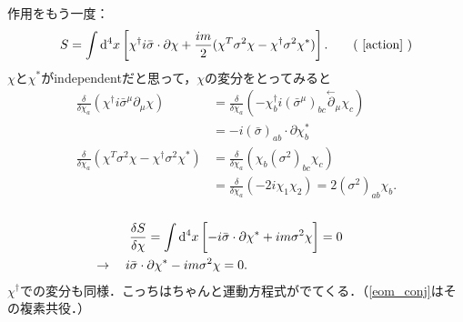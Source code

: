 \documentclass[pdflatex,unicode,ja=standard,12pt]{beamer}
\begin{document}
\begin{frame}
  
  \frametitle{\subsecname}

  作用をもう一度：
  \begin{equation}
    S
    =
    \int\dd^4 x
    \left[  
      \chi^{\dag}i\bar{\sigma}\cdot\partial\chi
      +
      \frac{im}{2}
      (  
        \chi^{T}\sigma^2\chi
        -
        \chi^{\dag}\sigma^2\chi^{*}
      )
    \right]
    .
    \tag{
      \ref{action}
    }
  \end{equation}
  $\chi$と$\chi^{*}$がindependentだと思って，$\chi$の変分をとってみると
  \begin{align}
    \frac{\delta}{\delta \chi_a}
    (
      \chi^{\dag}i\bar{\sigma}^{\mu}\partial_{\mu}\chi
     )
    &=
    \frac{\delta}{\delta \chi_a}
    (
      -\chi^{\dag}_{b}i(\bar{\sigma}^{\mu})_{bc}\overset{\leftarrow}{\partial}_{\mu}\chi_{c}
    )
    \nonumber
    \\
    &
    =
    -i(\bar{\sigma})_{ab}\cdot\partial\chi^{*}_{b}
    \\
    \frac{\delta}{\delta \chi_a}
    (
      \chi^{T}\sigma^2\chi
      -
      \chi^{\dag}\sigma^2\chi^{*}
    )
    &=
    \frac{\delta}{\delta \chi_a}
    (\chi_{b}(\sigma^2)_{bc}\chi_{c})
    \nonumber
    \\
    &
    =
    \frac{\delta}{\delta\chi_a}
    (
      -2i\chi_1\chi_2
    )
    =
    2(\sigma^2)_{ab}\chi_b
    .
  \end{align}

\end{frame}


\begin{frame}
  
  \frametitle{\subsecname}

  \begin{align}
    &\frac{\delta S}{\delta \chi}
    =
    \int\dd^4 x
    \left[  
      -
      i\bar{\sigma}\cdot\partial\chi^{*}
      +
      im\sigma^2\chi
      \vphantom{\frac{1}{2}}
    \right]
    =
    0
    \nonumber
    \\
    &
    \hspace{-1cm}
    \rightarrow
    \quad
    i\bar{\sigma}\cdot\partial\chi^{*}
    -
    im\sigma^2\chi
    =
    0
    .
    \label{eom_conj}
  \end{align}
  $\chi^{\dag}$での変分も同様．こっちはちゃんと運動方程式がでてくる．（\eqref{eom_conj}はその複素共役．）

\end{frame}
\end{document}
